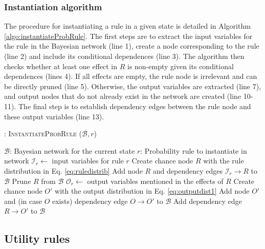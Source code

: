\subsubsection*{Instantiation algorithm} 
\label{sec:utilruleinstantiation}

The procedure for instantiating a rule in a given state is detailed in Algorithm \ref{algo:instantiateProbRule}.  The first steps are to extract the input variables for the rule in the Bayesian network (line 1), create a node corresponding to the rule (line 2) and include its conditional dependences (line 3).  The algorithm then checks whether at least one effect in $R$ is non-empty given its conditional dependences (lines 4).  If all effects are empty, the rule node is irrelevant and can be directly pruned (line 5). Otherwise, the output variables are extracted (line 7), and output nodes that do not already exist in the network are created (line 10-11). The final step is to establish  dependency edges between the rule node and these output variables (line 13).

\begin{algorithm}[h!]
\caption{: \textsc{InstantiateProbRule} ($\mathcal{B}, r$)}
\begin{algorithmic}[1] \vspace{1mm}
\REQUIRE $\mathcal{B}$: Bayesian network for the current state
\REQUIRE $r$: Probability rule to instantiate in network  \vspace{1mm}
\STATE $\mathcal{I}_{r} \leftarrow$ input variables for rule $r$
\STATE Create chance node $R$ with the rule distribution in Eq. \eqref{eq:ruledistrib}
\STATE Add node $R$ and dependency edges $\mathcal{I}_{r} \rightarrow R$ to $\mathcal{B}$ 
\STATE Prune $R$ from $\mathcal{B}$
\ELSE
\STATE $\mathcal{O}_{r} \leftarrow$ output variables mentioned in the effects of $R$
\STATE Create chance node $O'$ with the output distribution in Eq. \eqref{eq:outputdist1}
\STATE Add node $O'$ and (in case $O$ exists) dependency edge $O \rightarrow O'$ to $\mathcal{B}$
\ENDIF
\STATE Add dependency edge $R \rightarrow O'$ to $\mathcal{B}$ 
\ENDFOR
\ENDIF
\end{algorithmic}
\label{algo:instantiateProbRule}
\end{algorithm}

\subsection{Utility rules}

